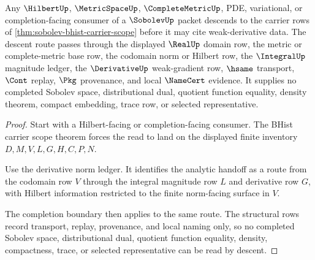 \begin{theorem}
\label{thm:sobolev-hilbert-completion-descent}
Any $\HilbertUp$, $\MetricSpaceUp$, $\CompleteMetricUp$, PDE, variational, or completion-facing consumer of a $\SobolevUp$ packet descends to the carrier rows of \autoref{thm:sobolev-bhist-carrier-scope} before it may cite weak-derivative data. The descent route passes through the displayed $\RealUp$ domain row, the metric or complete-metric base row, the codomain norm or Hilbert row, the $\IntegralUp$ magnitude ledger, the $\DerivativeUp$ weak-gradient row, $\hsame$ transport, $\Cont$ replay, $\Pkg$ provenance, and local $\NameCert$ evidence. It supplies no completed Sobolev space, distributional dual, quotient function equality, density theorem, compact embedding, trace row, or selected representative.
\end{theorem}
\begin{proof}
Start with a Hilbert-facing or completion-facing consumer. The BHist carrier scope theorem forces the read to land on the displayed finite inventory $D,M,V,L,G,H,C,P,N$.

Use the derivative norm ledger. It identifies the analytic handoff as a route from the codomain row $V$ through the integral magnitude row $L$ and derivative row $G$, with Hilbert information restricted to the finite norm-facing surface in $V$.

The completion boundary then applies to the same route. The structural rows record transport, replay, provenance, and local naming only, so no completed Sobolev space, distributional dual, quotient function equality, density, compactness, trace, or selected representative can be read by descent.
\end{proof}

